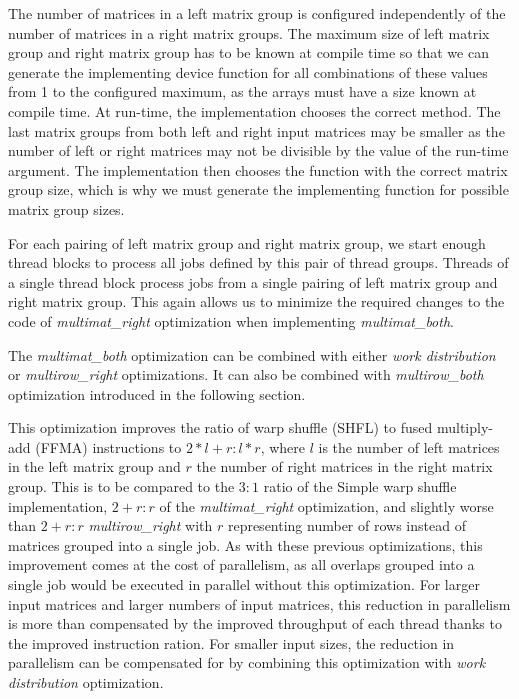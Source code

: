The number of matrices in a left matrix group is configured independently of the number of matrices in a right matrix groups. The maximum size of left matrix group and right matrix group has to be known at compile time so that we can generate the implementing device function for all combinations of these values from 1 to the configured maximum, as the arrays must have a size known at compile time. At run-time, the implementation chooses the correct method. The last matrix groups from both left and right input matrices may be smaller as the number of left or right matrices may not be divisible by the value of the run-time argument. The implementation then chooses the function with the correct matrix group size, which is why we must generate the implementing function for possible matrix group sizes.

For each pairing of left matrix group and right matrix group, we start enough thread blocks to process all jobs defined by this pair of thread groups. Threads of a single thread block process jobs from a single pairing of left matrix group and right matrix group. This again allows us to minimize the required changes to the code of \textit{multimat\_right} optimization when implementing \textit{multimat\_both}.


The \textit{multimat\_both} optimization can be combined with either \textit{work distribution} or \textit{multirow\_right} optimizations. It can also be combined with \textit{multirow\_both} optimization introduced in the following section.



This optimization improves the ratio of warp shuffle (SHFL) to fused multiply-add (FFMA) instructions to $ 2 * l + r : l * r$, where $l$ is the number of left matrices in the left matrix group and $r$ the number of right matrices in the right matrix group. This is to be compared to the $3:1$ ratio of the Simple warp shuffle implementation, $2 + r : r$ of the \textit{multimat\_right} optimization, and slightly worse than $2 + r : r$ \textit{multirow\_right} with $r$ representing number of rows instead of matrices grouped into a single job. As with these previous optimizations, this improvement comes at the cost of parallelism, as all overlaps grouped into a single job would be executed in parallel without this optimization. For larger input matrices and larger numbers of input matrices, this reduction in parallelism is more than compensated by the improved throughput of each thread thanks to the improved instruction ration. For smaller input sizes, the reduction in parallelism can be compensated for by combining this optimization with \textit{work distribution} optimization.

